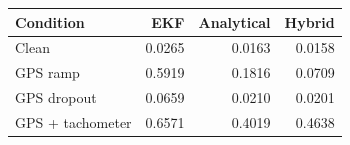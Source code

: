 \begin{tabular}{lrrr}
\toprule
Condition & EKF & Analytical & Hybrid \\
\midrule
Clean & 0.0265 & 0.0163 & 0.0158 \\
GPS ramp & 0.5919 & 0.1816 & 0.0709 \\
GPS dropout & 0.0659 & 0.0210 & 0.0201 \\
GPS + tachometer & 0.6571 & 0.4019 & 0.4638 \\
\bottomrule
\end{tabular}
